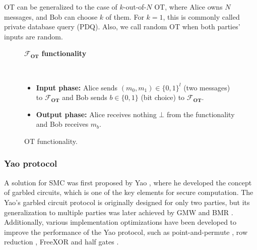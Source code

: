 OT can be generalized to the case of $k$-out-of-$N$ OT, where Alice owns $N$ messages, and Bob can choose $k$ of them. For $k=1$, this is commonly called private database query (PDQ). Also, we call random OT when both parties' inputs are random.

\begin{figure}[b!]
\centering
\begin{tcolorbox}
                        
    \centerline{$\mathcal{F}_{\textbf{OT}}$ \textbf{functionality}}
            
    \
    
    \begin{itemize}
    		\item \textbf{Input phase:} Alice sends $(m_0, m_1)\in\{0,1\}^l$ (two messages) to $\mathcal{F}_{\textbf{OT}}$ and Bob sends $b\in\{0,1\}$ (bit choice) to $\mathcal{F}_{\textbf{OT}}$.
    		\item \textbf{Output phase:} Alice receives nothing $\bot$ from the functionality and Bob receives $m_b$.
    \end{itemize}
    
\end{tcolorbox} 
    \caption{OT functionality.}
    \label{fig:OT_functionality}
\end{figure}

\subsubsection{Yao protocol}\label{yaoProtocol}

A solution for SMC was first proposed by Yao \cite{Yao82}, where he developed the concept of garbled circuits, which is one of the key elements for secure computation. The Yao's garbled circuit protocol is originally designed for only two parties, but its generalization to multiple parties was later achieved by GMW \cite{Goldreich87} and BMR \cite{BMR90}. Additionally, various implementation optimizations have been developed to improve the performance of the Yao protocol, such as point-and-permute \cite{BMR90}, row reduction \cite{NPS99, Pinkas2009}, FreeXOR \cite{Kolesnikov2005} and half gates \cite{Zahur2015}.

